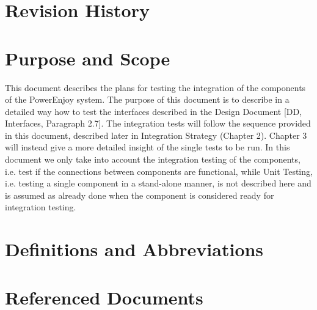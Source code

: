 \section{Revision History}

\section{Purpose and Scope}
This document describes the plans for testing the integration of the components of the PowerEnjoy system. The purpose of this document is to describe in a detailed way how to test the interfaces described in the Design Document [DD, Interfaces, Paragraph 2.7]. The integration tests will follow the sequence provided in this document, described later in Integration Strategy (Chapter 2). Chapter 3 will instead give a more detailed insight of the single tests to be run.
\newline
In this document we only take into account the integration testing of the components, i.e. test if the connections between components are functional, while Unit Testing, i.e. testing a single component in a stand-alone manner, is not described here and is assumed as already done when the component is considered ready for integration testing.

\section{Definitions and Abbreviations}
\section{Referenced Documents}





